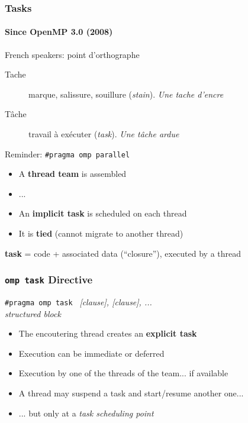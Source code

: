 \documentclass{beamer}
\begin{document}
\begin{frame}
  \frametitle{Tasks}
  \framesubtitle{Since OpenMP 3.0 (2008)}

  \begin{alertblock}{French speakers: point d'orthographe}
  \begin{description}
    \item[Tache] marque, salissure, souillure (\emph{stain}). \textit{Une tache d'encre}
    \item[Tâche] travail à exécuter (\emph{task}). \textit{Une tâche ardue}
    \end{description}
  \end{alertblock}

  \pause
  
  \begin{block}{Reminder: \texttt{\#pragma omp parallel}}
    \begin{itemize}
    \item A \alert{\textbf{thread team}} is assembled
    \item ...
    \item An \alert{\textbf{implicit task}} is scheduled on each thread
    \item It is \alert{\textbf{tied}} (cannot migrate to another thread)
    \end{itemize}
  \end{block}
  
  \medskip
  
  \textbf{task} = code + associated data (``closure''), executed by a thread
\end{frame}


\begin{frame}
  \frametitle{\texttt{omp task} Directive}

  \begin{framed}
  {\tt \#pragma omp task } {\it [clause], [clause], ...}  \\
  {\it structured block} 
\end{framed}

\begin{itemize}
\item The encoutering thread creates an \textbf{explicit task}
\item Execution can be \alert{immediate} or \alert{deferred}
\item Execution by one of the threads of the team... if available
\pause
\item A thread may suspend a task and start/resume another one...
  \item ... but only at a \emph{task scheduling point}
\end{itemize}
\end{frame}
\end{document}
